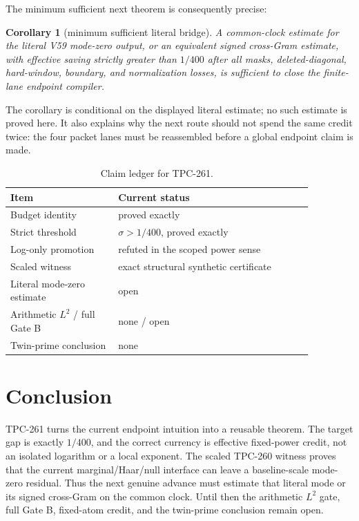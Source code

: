 \documentclass[11pt]{article}
\newtheorem{corollary}{Corollary}
\theoremstyle{definition}
\begin{document}
The minimum sufficient next theorem is consequently precise:

\begin{corollary}[minimum sufficient literal bridge]
A common-clock estimate for the literal V59 mode-zero output, or an equivalent
signed cross-Gram estimate, with effective saving strictly greater than
$1/400$ after all masks, deleted-diagonal, hard-window, boundary, and
normalization losses, is sufficient to close the finite-lane endpoint compiler.
\end{corollary}

The corollary is conditional on the displayed literal estimate; no such
estimate is proved here.  It also explains why the next route should not spend
the same credit twice: the four packet lanes must be reassembled before a
global endpoint claim is made.

\begin{table}[b]
\centering
\caption{Claim ledger for TPC-261.}
\label{tab:firewall}
\begin{tabular}{p{0.31\linewidth}p{0.56\linewidth}}
\toprule
Item & Current status\\
\midrule
Budget identity & proved exactly\\
Strict threshold & $\sigma>1/400$, proved exactly\\
Log-only promotion & refuted in the scoped power sense\\
Scaled witness & exact structural synthetic certificate\\
Literal mode-zero estimate & open\\
Arithmetic $L^2$ / full Gate B & none / open\\
Twin-prime conclusion & none\\
\bottomrule
\end{tabular}
\end{table}

\section{Conclusion}

TPC-261 turns the current endpoint intuition into a reusable theorem.  The
target gap is exactly $1/400$, and the correct currency is effective fixed-power
credit, not an isolated logarithm or a local exponent.  The scaled TPC-260
witness proves that the current marginal/Haar/null interface can leave a
baseline-scale mode-zero residual.  Thus the next genuine advance must estimate
that literal mode or its signed cross-Gram on the common clock.  Until then the
arithmetic $L^2$ gate, full Gate B, fixed-atom credit, and the twin-prime
conclusion remain open.
\end{document}
